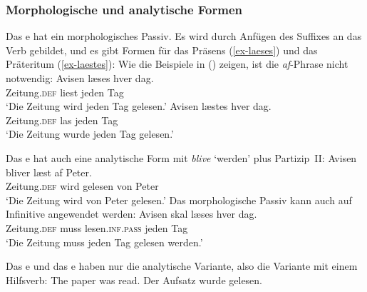 \subsubsection{Morphologische und analytische Formen}

Das e hat ein morphologisches Passiv. Es wird durch Anfügen des Suffixes  an das Verb gebildet, und es
gibt Formen für das Präsens (\ref{ex-laeses}) und das Präteritum (\ref{ex-laestes}):
\eal
{}
\zl
Wie die Beispiele in () zeigen, ist die \emph{af}-Phrase nicht notwendig:
\eal
\ex 
\gll Avisen        læses           hver   dag.\\
     Zeitung.\textsc{def} liest jeden Tag\\\danish
\glt `Die Zeitung wird jeden Tag gelesen.'
\ex 
\gll Avisen        læstes           hver   dag.\\
     Zeitung.\textsc{def} las jeden Tag\\
\glt `Die Zeitung wurde jeden Tag gelesen.'
\zl

\noindent
Das e hat auch eine analytische Form mit \emph{blive} `werden' plus Partizip~II:
\ea
\gll Avisen                 bliver læst af Peter.\\
     Zeitung.\textsc{def} wird gelesen von Peter\\\danish
\glt `Die Zeitung wird von Peter gelesen.'
\z
Das morphologische Passiv kann auch auf Infinitive angewendet werden:
\ea
\gll Avisen skal læses hver dag.\\
     Zeitung.\textsc{def} muss lesen.\textsc{inf}.\textsc{pass} jeden Tag\\\danish
\glt `Die Zeitung muss jeden Tag gelesen werden.'
\z

\noindent
Das e und das e haben nur die analytische Variante, also die Variante mit einem
Hilfsverb:
\eal
\ex The paper was read.
\ex 
Der        Aufsatz wurde  gelesen.
\zl    

